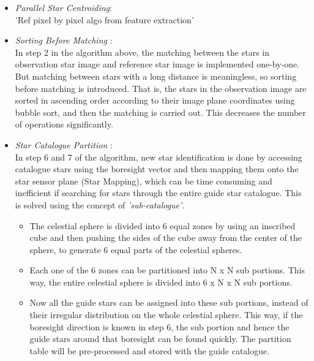 \documentclass[../../main.tex]{subfiles}
\begin{document}
\begin{itemize}
    \item \textit{Parallel Star Centroiding}:\\
    'Ref pixel by pixel algo from feature extraction'
    
    \item \textit{Sorting Before Matching} \label{sorting_before_matching}:\\
    In step 2 in the algorithm above, the matching between the stars in observation star image and reference star image is implemented one-by-one. But matching between stars with a long distance is meaningless, so sorting before matching is introduced. That is, the stars in the observation image are sorted in ascending order according to their image plane coordinates using bubble sort, and then the matching is carried out. This decreases the number of operations significantly. 
    
    \item \textit{Star Catalogue Partition} \label{catalogue_partition}:\\
    In step 6 and 7 of the algorithm, new star identification is done by accessing catalogue stars using the boresight vector and then mapping them onto the star sensor plane (Star Mapping), which can be time consuming and inefficient if searching for stars through the entire guide star catalogue. This is solved using the concept of \textit{'sub-catalogue'}.
    \begin{itemize}
        \item The celestial sphere is divided into 6 equal zones by using an inscribed cube and then pushing the sides of the cube away from the center of the sphere, to generate 6 equal parts of the celestial spheres. 
        \item Each one of the 6 zones can be partitioned into N x N sub portions. This way, the entire celestial sphere is divided into 6 x N x N sub portions. 
        \item Now all the guide stars can be assigned into these sub portions, instead of their irregular distribution on the whole celestial sphere. This way, if the boresight direction is known in step 6, the sub portion and hence the guide stars around that boresight can be found quickly. The partition table will be pre-processed and stored with the guide catalogue. 
    \end{itemize}
\end{itemize}
\end{document}
